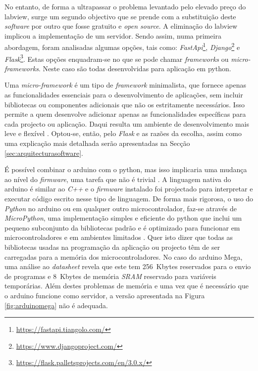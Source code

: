 No entanto, de forma a ultrapassar o problema levantado pelo elevado preço do \acrshort{labview}, surge um segundo objectivo que se prende com a substituição deste \textit{software} por outro que fosse gratuito e \textit{open source}. A eliminação do \acrshort{labview} implicou a implementação de um servidor. Sendo assim, numa primeira abordagem, foram analisadas algumas opções, tais como: \textit{FastApi}\footnote{\url{https://fastapi.tiangolo.com/}}, \textit{Django}\footnote{\url{https://www.djangoproject.com/}} e \textit{Flask}\footnote{\url{https://flask.palletsprojects.com/en/3.0.x/}}. Estas opções enquadram-se no que se pode chamar \textit{frameworks} ou \textit{micro-frameworks}. Neste caso são todas desenvolvidas para aplicação em \gls{python}.

Uma \textit{micro-framework} é um tipo de \textit{framework} minimalista, que fornece apenas as funcionalidades essenciais para o desenvolvimento de aplicações, sem incluir bibliotecas ou componentes adicionais que não os estritamente necessários. Isso permite a quem desenvolve adicionar apenas as funcionalidades específicas para cada projecto ou aplicação. Daqui resulta um ambiente de desenvolvimento mais leve e flexível \cite{Flask}.
Optou-se, então, pelo \textit{Flask} e as razões da escolha, assim como uma explicação mais detalhada serão apresentadas na Secção \ref{sec:arquitecturasoftware}.

É possível combinar o \gls{arduino} com o \gls{python}, mas isso implicaria uma mudança ao nível do \textit{firmware}, uma tarefa que não é trivial \cite{Arduinopython}. A linguagem nativa do \gls{arduino} é similar ao \textit{C++} e o \textit{firmware} instalado foi projectado para interpretar e executar código escrito nesse tipo de linguagem. De forma mais rigorosa, o uso do \textit{Python} no \gls{arduino} ou em qualquer outro microcontrolador, faz-se através de \textit{MicroPython}, uma implementação simples e eficiente do \gls{python} que inclui um pequeno subconjunto da bibliotecas padrão e é optimizado para funcionar em microcontroladores e em ambientes limitados \cite{MicroPythondefinition}. Quer isto dizer que todas as bibliotecas usadas na programação da aplicação ou projecto têm de ser carregadas para a memória dos microcontroladores. No caso do \gls{arduino} Mega, uma análise ao \textit{datasheet} \cite{megadatasheet} revela que este tem \SI{256}{Kbytes} reservados para o envio de programas e \SI{8}{Kbytes} de memória \textit{SRAM} reservado para variáveis temporárias.
Além destes problemas de memória e uma vez que é necessário que o \gls{arduino} funcione como servidor, a versão apresentada na Figura \ref{fig:arduinomega} não é adequada.

